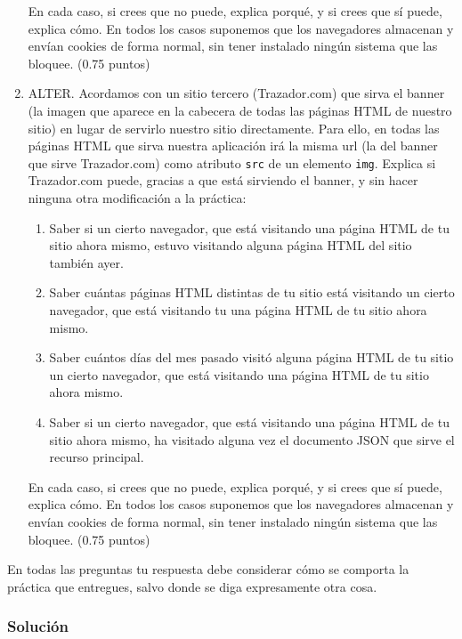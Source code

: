 \begin{enumerate}
  En cada caso, si crees que no puede, explica porqué, y si crees que sí puede, explica cómo. En todos los casos suponemos que los navegadores almacenan y envían cookies de forma normal, sin tener instalado ningún sistema que las bloquee. (0.75 puntos)

\item ALTER. Acordamos con un sitio tercero (Trazador.com) que sirva el banner (la imagen que aparece en la cabecera de todas las páginas HTML de nuestro sitio) en lugar de servirlo nuestro sitio directamente. Para ello, en todas las páginas HTML que sirva nuestra aplicación irá la misma url (la del banner que sirve Trazador.com) como atributo \verb|src| de un elemento \verb|img|. Explica si Trazador.com puede, gracias a que está sirviendo el banner, y sin hacer ninguna otra modificación a la práctica:
  \begin{enumerate}
  \item Saber si un cierto navegador, que está visitando una página HTML de tu sitio ahora mismo, estuvo visitando alguna página HTML del sitio también ayer.
  \item Saber cuántas páginas HTML distintas de tu sitio está visitando un cierto navegador, que está visitando tu una página HTML de tu sitio ahora mismo.
  \item Saber cuántos días del mes pasado visitó alguna página HTML de tu sitio un cierto navegador, que está visitando una página HTML de tu sitio ahora mismo.
  \item Saber si un cierto navegador, que está visitando una página HTML de tu sitio ahora mismo, ha visitado alguna vez el documento JSON que sirve el recurso principal.
  \end{enumerate}

  En cada caso, si crees que no puede, explica porqué, y si crees que sí puede, explica cómo. En todos los casos suponemos que los navegadores almacenan y envían cookies de forma normal, sin tener instalado ningún sistema que las bloquee. (0.75 puntos)

\end{enumerate}

En todas las preguntas tu respuesta debe considerar cómo se comporta la práctica que entregues, salvo donde se diga expresamente otra cosa.

\subsubsection{Solución}

